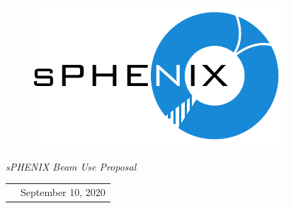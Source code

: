 \renewcommand*\familydefault{\sfdefault}
{\sffamily
\vfill
\vspace{4cm}
\begin{figure}[H]
  \begin{center}
  \includegraphics[width=0.6\linewidth]{figs/sPHENIX}
  \end{center}
\end{figure}

\vfill

\begin{center}
  \large
  \emph{\Large{sPHENIX Beam Use Proposal}}

  \begin{tabular}{rl}
  &September 10, 2020 \\
  \end{tabular}
\end{center}

\vspace{2cm}

}



\renewcommand*\familydefault{\rmdefault}
